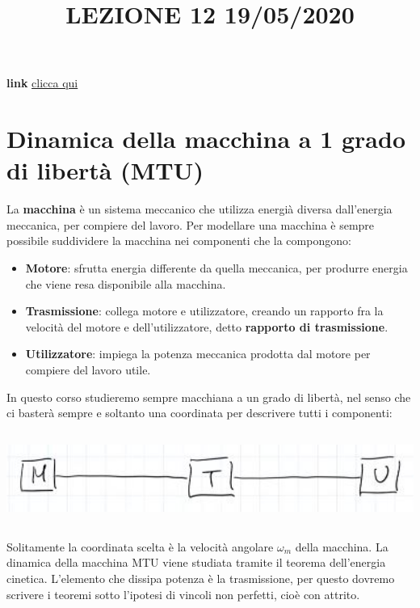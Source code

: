 \title{LEZIONE 12 19/05/2020}\newline
\textbf{link} \href{https://web.microsoftstream.com/video/4108da02-d3de-45e4-ab46-94d93c315e97}{clicca qui}
\section{Dinamica della macchina a 1 grado di libertà (MTU)}
La \textbf{macchina} è un sistema meccanico che utilizza energià diversa dall'energia meccanica, per compiere del lavoro.\newline
\newline
Per modellare una macchina è sempre possibile suddividere la macchina nei componenti che la compongono:
\begin{itemize}
    \item \textbf{Motore}: sfrutta energia differente da quella meccanica, per produrre energia che viene resa disponibile alla macchina.
    \item \textbf{Trasmissione}: collega motore e utilizzatore, creando un rapporto fra la velocità del motore e dell'utilizzatore, detto \textbf{rapporto di trasmissione}.
    \item \textbf{Utilizzatore}: impiega la potenza meccanica prodotta dal motore per compiere del lavoro utile.
\end{itemize}
In questo corso studieremo sempre macchiana a un grado di libertà, nel senso che ci basterà sempre e soltanto una coordinata per descrivere tutti i componenti:
\begin{center}
    \includegraphics[height=3cm]{../lezione12/img1.JPG}
\end{center}
Solitamente la coordinata scelta è la velocità angolare $\omega_m$ della macchina.\newline
\newline
La dinamica della macchina MTU viene studiata tramite il teorema dell'energia cinetica.\newline
\newline
L'elemento che dissipa potenza è la trasmissione, per questo dovremo scrivere i teoremi sotto l'ipotesi di vincoli non perfetti, cioè con attrito.\newline
